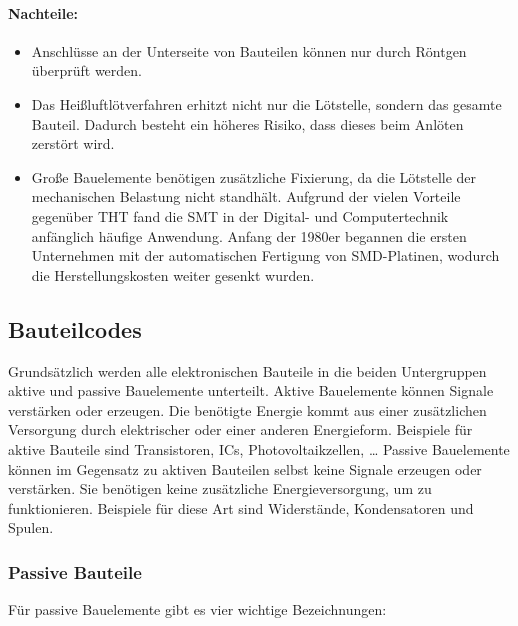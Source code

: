 \paragraph{Nachteile:}
\begin{itemize}
	\item Anschlüsse an der Unterseite von Bauteilen können nur durch Röntgen überprüft werden.
	\item Das Heißluftlötverfahren erhitzt nicht nur die Lötstelle, sondern das gesamte Bauteil.
 	Dadurch besteht ein höheres Risiko, dass dieses beim Anlöten zerstört wird.
 	\item Große Bauelemente benötigen zusätzliche Fixierung, da die Lötstelle der mechanischen Belastung nicht standhält.
	Aufgrund der vielen Vorteile gegenüber THT fand die SMT in der Digital- und Computertechnik anfänglich häufige Anwendung.
	Anfang der 1980er begannen die ersten Unternehmen mit der automatischen Fertigung von SMD-Platinen, wodurch die Herstellungskosten weiter gesenkt wurden.	
\end{itemize}

\subsection{Bauteilcodes}
Grundsätzlich werden alle elektronischen Bauteile in die beiden Untergruppen aktive und passive Bauelemente unterteilt.
Aktive Bauelemente können Signale verstärken oder erzeugen. Die benötigte Energie kommt aus einer zusätzlichen Versorgung durch elektrischer oder einer anderen Energieform. Beispiele für aktive Bauteile sind Transistoren, ICs, Photovoltaikzellen, …
Passive Bauelemente können im Gegensatz zu aktiven Bauteilen selbst keine Signale erzeugen oder verstärken. Sie benötigen keine zusätzliche Energieversorgung, um zu funktionieren. Beispiele für diese Art sind Widerstände, Kondensatoren und Spulen.

\subsubsection{Passive Bauteile}
Für passive Bauelemente gibt es vier wichtige Bezeichnungen:

